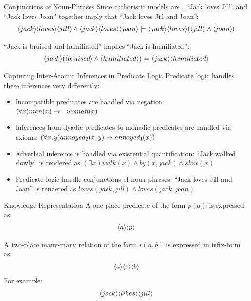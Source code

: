 \begin{frame}{Conjunctions of Noun-Phrases}
Since cathoristic models are , ``Jack loves Jill''  and ``Jack loves Joan'' together imply that ``Jack loves Jill and Joan'':
\[
\langle jack \rangle \langle loves \rangle \langle jill \rangle \land \langle jack \rangle \langle loves \rangle \langle joan \rangle \models \langle jack \rangle \langle loves \rangle (\langle jill \rangle \land \langle joan \rangle )
\]
\end{frame}

\begin{frame}
``Jack is bruised and humiliated'' implies ``Jack is humiliated'':
\[
\langle jack \rangle (\langle bruised \rangle \land \langle humiliated \rangle ) \models \langle jack \rangle \langle humiliated \rangle \]
\end{frame}

\begin{frame}{Capturing Inter-Atomic Inferences in Predicate Logic}
Predicate logic handles these inferences very differently:
\begin{itemize}
\item
Incompatible predicates are handled via negation: $(\forall x) man(x) \rightarrow \neg woman(x)$
\item
Inferences from dyadic predicates to monadic predicates are handled via axioms: $(\forall x, y) annoyed_2(x,y) \rightarrow annoyed_1(x))$
\item
Adverbial inference is handled via existential quantification: ``Jack walked slowly'' is rendered as $(\exists x) walk(x) 
\land by(x, jack) \land slow(x)$
\item
Predicate logic  handle conjunctions of noun-phrases. ``Jack loves Jill and Joan'' is rendered as $loves(jack, jill) \land loves(jack, joan)$
\end{itemize}
\end{frame}



\begin{frame}{Knowledge Representation}
A one-place predicate of the form $p(a)$ is expressed as:
\[
\langle a \rangle \langle p \rangle \]
\end{frame}

\begin{frame}
A two-place many-many relation of the form $r(a, b)$ is expressed in infix-form as:
\[
\langle a \rangle \langle r \rangle \langle b \rangle \]
For example:
\[
\langle jack \rangle \langle likes \rangle \langle jill \rangle \]

\end{frame}


